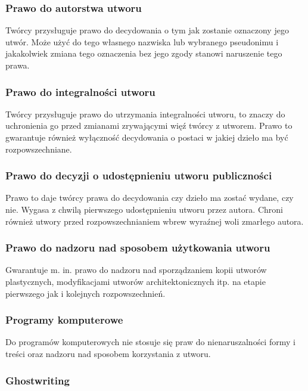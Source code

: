 \documentclass{article}
\begin{document}
\subsubsection{Prawo do autorstwa utworu}

Twórcy przysługuje prawo do decydowania o tym jak zostanie oznaczony jego utwór.
Może użyć do tego własnego nazwiska lub wybranego pseudonimu i jakakolwiek zmiana tego oznaczenia bez jego zgody stanowi naruszenie tego prawa.

\subsubsection{Prawo do integralności utworu}

Twórcy przysługuje prawo do utrzymania integralności utworu, to znaczy do uchronienia go przed zmianami zrywającymi więź twórcy z utworem.
Prawo to gwarantuje również wyłączność decydowania o postaci w jakiej dzieło ma być rozpowszechniane.

\subsubsection{Prawo do decyzji o udostępnieniu utworu publiczności}

Prawo to daje twórcy prawa do decydowania czy dzieło ma zostać wydane, czy nie. Wygasa z chwilą pierwszego udostępnieniu utworu przez autora. Chroni również utwory przed rozpowszechnianiem wbrew wyraźnej woli zmarłego autora.

\subsubsection{Prawo do nadzoru nad sposobem użytkowania utworu}

Gwarantuje m. in. prawo do nadzoru nad sporządzaniem kopii utworów plastycznych, modyfikacjami utworów architektonicznych itp. na etapie pierwszego jak i kolejnych rozpowszechnień.

\subsubsection{Programy komputerowe}

Do programów komputerowych nie stosuje się praw do nienaruszalności formy i treści oraz nadzoru nad sposobem korzystania z utworu.

\subsubsection{Ghostwriting}
\end{document}

